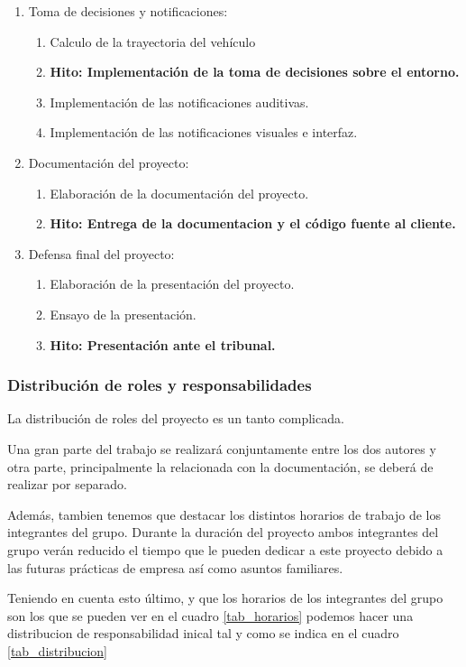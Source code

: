 \begin{enumerate}
  \item Toma de decisiones y notificaciones:
  \begin{enumerate}
    \item Calculo de la trayectoria del vehículo
    \item \textbf{Hito: Implementación de la toma de decisiones sobre el entorno.}
    \item Implementación de las notificaciones auditivas.
    \item Implementación de las notificaciones visuales e interfaz.
  \end{enumerate}

  \item Documentación del proyecto:
  \begin{enumerate}
    \item Elaboración de la documentación del proyecto.
    \item \textbf{Hito: Entrega de la documentacion y el código fuente al cliente.}
  \end{enumerate}

  \item Defensa final del proyecto:
  \begin{enumerate}
    \item Elaboración de la presentación del proyecto.
    \item Ensayo de la presentación.
    \item \textbf{Hito: Presentación ante el tribunal.}
  \end{enumerate}
\end{enumerate}


\subsubsection{Distribución de roles y responsabilidades}

La distribución de roles del proyecto es un tanto complicada.

Una gran parte del trabajo se realizará conjuntamente entre los dos autores y otra parte, principalmente la relacionada con la documentación, se deberá de realizar por separado.

Además, tambien tenemos que destacar los distintos horarios de trabajo de los integrantes del grupo. Durante la duración del proyecto ambos integrantes del grupo verán reducido el tiempo que le pueden dedicar a este proyecto debido a las futuras prácticas de empresa así como asuntos familiares.

Teniendo en cuenta esto último, y que los horarios de los integrantes del grupo son los que se pueden ver en el cuadro \ref{tab_horarios} podemos hacer una distribucion de responsabilidad inical tal y como se indica en el cuadro \ref{tab_distribucion}


